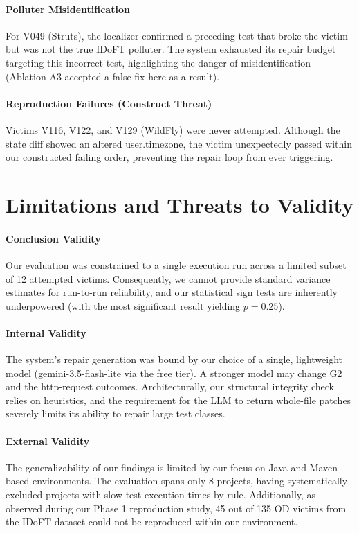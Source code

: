 \documentclass[conference]{IEEEtran}
\begin{document}
\paragraph{Polluter Misidentification} For V049 (Struts), the localizer confirmed a preceding test that broke the victim but was not the true IDoFT polluter. The system exhausted its repair budget targeting this incorrect test, highlighting the danger of misidentification (Ablation A3 accepted a false fix here as a result).

\paragraph{Reproduction Failures (Construct Threat)} Victims V116, V122, and V129 (WildFly) were never attempted. Although the state diff showed an altered user.timezone, the victim unexpectedly passed within our constructed failing order, preventing the repair loop from ever triggering.

\section{Limitations and Threats to Validity}
\label{sec:threats}
\paragraph{Conclusion Validity} Our evaluation was constrained to a single execution run across a limited subset of 12 attempted victims. Consequently, we cannot provide standard variance estimates for run-to-run reliability, and our statistical sign tests are inherently underpowered (with the most significant result yielding $p = 0.25$). 

\paragraph{Internal Validity} The system's repair generation was bound by our choice of a single, lightweight model (gemini-3.5-flash-lite via the free tier). A stronger model may change G2 and the http-request outcomes. Architecturally, our structural integrity check relies on heuristics, and the requirement for the LLM to return whole-file patches severely limits its ability to repair large test classes. 

\paragraph{External Validity} The generalizability of our findings is limited by our focus on Java and Maven-based environments. The evaluation spans only 8 projects, having systematically excluded projects with slow test execution times by rule. Additionally, as observed during our Phase 1 reproduction study, 45 out of 135 OD victims from the IDoFT dataset could not be reproduced within our environment.
\end{document}
